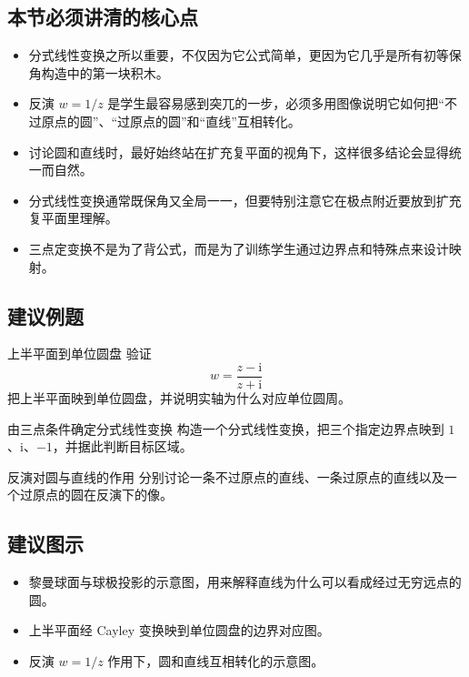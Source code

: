 \subsection*{本节必须讲清的核心点}
\begin{itemize}
    \item 分式线性变换之所以重要，不仅因为它公式简单，更因为它几乎是所有初等保角构造中的第一块积木。
    \item 反演 $w=1/z$ 是学生最容易感到突兀的一步，必须多用图像说明它如何把``不过原点的圆''、``过原点的圆''和``直线''互相转化。
    \item 讨论圆和直线时，最好始终站在扩充复平面的视角下，这样很多结论会显得统一而自然。
    \item 分式线性变换通常既保角又全局一一，但要特别注意它在极点附近要放到扩充复平面里理解。
    \item 三点定变换不是为了背公式，而是为了训练学生通过边界点和特殊点来设计映射。
\end{itemize}

\subsection*{建议例题}
\begin{lizi}{上半平面到单位圆盘}{}
验证
\[
    w=\frac{z-\mathrm{i}}{z+\mathrm{i}}
\]
把上半平面映到单位圆盘，并说明实轴为什么对应单位圆周。
\end{lizi}

\begin{lizi}{由三点条件确定分式线性变换}{}
构造一个分式线性变换，把三个指定边界点映到 $1$、$\mathrm{i}$、$-1$，并据此判断目标区域。
\end{lizi}

\begin{lizi}{反演对圆与直线的作用}{}
分别讨论一条不过原点的直线、一条过原点的直线以及一个过原点的圆在反演下的像。
\end{lizi}

\subsection*{建议图示}
\begin{itemize}
    \item 黎曼球面与球极投影的示意图，用来解释直线为什么可以看成经过无穷远点的圆。
    \item 上半平面经 Cayley 变换映到单位圆盘的边界对应图。
    \item 反演 $w=1/z$ 作用下，圆和直线互相转化的示意图。
\end{itemize}

